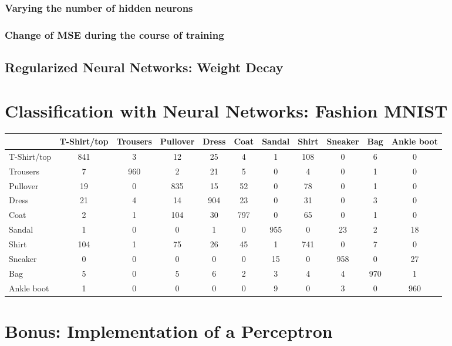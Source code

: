 \documentclass{article}
\begin{document}
\subsubsection{Varying the number of hidden neurons}


\subsubsection{Change of MSE during the course of training}

\clearpage
\subsection{Regularized Neural Networks: Weight Decay}

\clearpage
\section{Classification with Neural Networks: Fashion MNIST}


\begin{table}[]
      \begin{tabular}{|l|c|c|c|c|c|c|c|c|c|c|}
      \hline
                  & T-Shirt/top & Trousers & Pullover & Dress & Coat & Sandal & Shirt & Sneaker & Bag & Ankle boot \\ \hline
      T-Shirt/top & 841         & 3        & 12       & 25    & 4    & 1      & 108   & 0       & 6   & 0          \\ \hline
      Trousers    & 7           & 960      & 2        & 21    & 5    & 0      & 4     & 0       & 1   & 0          \\ \hline
      Pullover    & 19          & 0        & 835      & 15    & 52   & 0      & 78    & 0       & 1   & 0          \\ \hline
      Dress       & 21          & 4        & 14       & 904   & 23   & 0      & 31    & 0       & 3   & 0          \\ \hline
      Coat        & 2           & 1        & 104      & 30    & 797  & 0      & 65    & 0       & 1   & 0          \\ \hline
      Sandal      & 1           & 0        & 0        & 1     & 0    & 955    & 0     & 23      & 2   & 18         \\ \hline
      Shirt       & 104         & 1        & 75       & 26    & 45   & 1      & 741   & 0       & 7   & 0          \\ \hline
      Sneaker     & 0           & 0        & 0        & 0     & 0    & 15     & 0     & 958     & 0   & 27         \\ \hline
      Bag         & 5           & 0        & 5        & 6     & 2    & 3      & 4     & 4       & 970 & 1          \\ \hline
      Ankle boot  & 1           & 0        & 0        & 0     & 0    & 9      & 0     & 3       & 0   & 960        \\ \hline
      \end{tabular}
      \end{table}

\clearpage
\section{Bonus: Implementation of a Perceptron}
\end{document}

